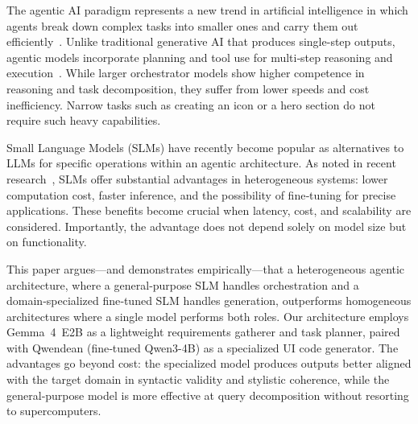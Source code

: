 \documentclass[pdflatex,sn-mathphys-num]{sn-jnl}
\theoremstyle{thmstyleone}
\theoremstyle{thmstyletwo}
\theoremstyle{thmstylethree}
\begin{document}
The agentic AI paradigm represents a new trend in artificial intelligence in which agents break down complex tasks into smaller ones and carry them out efficiently~\cite{ref1}. Unlike traditional generative AI that produces single-step outputs, agentic models incorporate planning and tool use for multi‑step reasoning and execution~\cite{ref2}. While larger orchestrator models show higher competence in reasoning and task decomposition, they suffer from lower speeds and cost inefficiency. Narrow tasks such as creating an icon or a hero section do not require such heavy capabilities.

Small Language Models (SLMs) have recently become popular as alternatives to LLMs for specific operations within an agentic architecture. As noted in recent research~\cite{ref1}, SLMs offer substantial advantages in heterogeneous systems: lower computation cost, faster inference, and the possibility of fine‑tuning for precise applications. These benefits become crucial when latency, cost, and scalability are considered. Importantly, the advantage does not depend solely on model size but on functionality.

This paper argues—and demonstrates empirically—that a heterogeneous agentic architecture, where a general‑purpose SLM handles orchestration and a domain‑specialized fine‑tuned SLM handles generation, outperforms homogeneous architectures where a single model performs both roles. Our architecture employs Gemma~4~E2B as a lightweight requirements gatherer and task planner, paired with Qwendean (fine‑tuned Qwen3-4B) as a specialized UI code generator. The advantages go beyond cost: the specialized model produces outputs better aligned with the target domain in syntactic validity and stylistic coherence, while the general‑purpose model is more effective at query decomposition without resorting to supercomputers.
\end{document}
